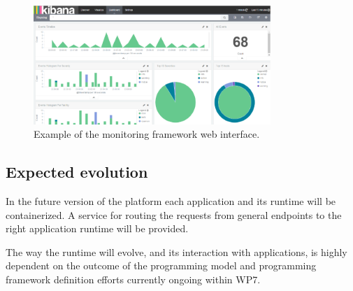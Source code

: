 \begin{figure}[!hbt]
\centering
\includegraphics[width=0.8\textwidth]{figs/kibana.pdf}
\caption{Example of the monitoring framework web interface.}
\end{figure}


\subsection{Expected evolution}

In the future version of the platform each application and its runtime will be containerized. A service for routing the requests from general endpoints to the right application runtime will be provided.

The way the runtime will evolve, and its interaction with applications, is highly dependent on the outcome of the programming model and programming framework definition efforts currently ongoing within WP7.